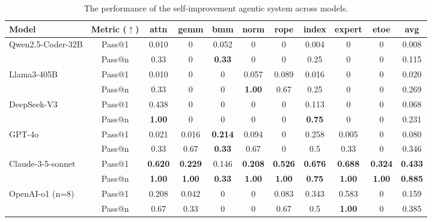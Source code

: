 \begin{table*}[htb]
\centering
\begin{tabular}{l c c c c c c c c c c}
\toprule
Model & Metric ($\uparrow$) & attn & gemm & bmm & norm & rope & index & expert & etoe & avg\\
\midrule
\multirow{2}{*}{Qwen2.5-Coder-32B} & Pass@1 & 0.010 & 0 & 0.052 & 0 & 0 & 0.004 & 0 & 0 & 0.008 \\
& Pass@n & 0.33 & 0 & \textbf{0.33} & 0 & 0 & 0.25 & 0 & 0 & 0.115\\
\midrule
\multirow{2}{*}{Llama3-405B} & Pass@1 & 0.010 & 0 & 0 & 0.057 & 0.089 & 0.016 & 0 & 0 & 0.020\\
& Pass@n & 0.33 & 0 & 0 & \textbf{1.00} & 0.67 & 0.25 & 0 & 0 & 0.269\\
\midrule
\multirow{2}{*}{DeepSeek-V3} & Pass@1 & 0.438 & 0 & 0 & 0 & 0 & 0.113 & 0 & 0 &0.068\\
& Pass@n & \textbf{1.00} & 0 & 0 & 0 & 0 & \textbf{0.75} & 0 & 0 & 0.231\\
\midrule
\multirow{2}{*}{GPT-4o} & Pass@1 & 0.021 & 0.016 & \textbf{0.214} & 0.094 & 0 & 0.258 & 0.005 & 0 & 0.080\\
& Pass@n & 0.33 & 0.67 & \textbf{0.33} & 0.67 & 0 & 0.5 & 0.33 & 0 & 0.346\\
\midrule
\multirow{2}{*}{Claude-3-5-sonnet} & Pass@1 & \textbf{0.620} & \textbf{0.229} & 0.146 & \textbf{0.208} & \textbf{0.526} & \textbf{0.676} & \textbf{0.688} & \textbf{0.324} & \textbf{0.433}\\
& Pass@n & \textbf{1.00} & \textbf{1.00} & \textbf{0.33} & \textbf{1.00} & \textbf{1.00} & \textbf{0.75} & \textbf{1.00} & \textbf{1.00} & \textbf{0.885}\\
\midrule
\multirow{2}{*}{OpenAI-o1 (n=8)} & Pass@1 & 0.208 & 0.042 & 0 & 0 & 0.083 & 0.343 & 0.583 & 0 & 0.159\\
  & Pass@n & 0.67 & 0.33 & 0 & 0 & 0.67 & 0.5 & \textbf{1.00} & 0 & 0.385\\
\bottomrule
\end{tabular}
\caption{The performance of the self-improvement agentic system across models.}
\label{tab:all-models}
\end{table*}

\newpage
